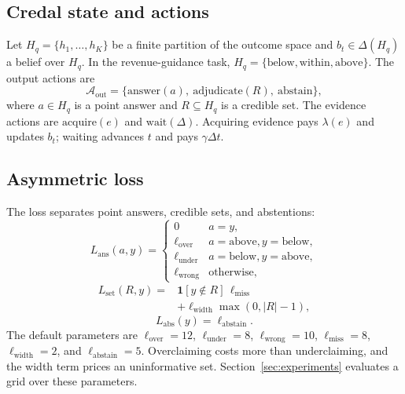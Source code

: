 \documentclass[11pt]{article}
\newcommand{\indic}{\mathbf{1}}
\begin{document}
\subsection{Credal state and actions}
Let $H_q=\{h_1,\dots,h_K\}$ be a finite partition of the outcome space and $b_t\in\Delta(H_q)$ a belief over $H_q$. In the revenue-guidance task, $H_q=\{\text{below},\text{within},\text{above}\}$. The output actions are
\begin{equation}
\mathcal A_{\text{out}}=\{\text{answer}(a),\ \text{adjudicate}(R),\ \text{abstain}\},
\end{equation}
where $a\in H_q$ is a point answer and $R\subseteq H_q$ is a credible set. The evidence actions are $\text{acquire}(e)$ and $\text{wait}(\Delta)$. Acquiring evidence pays $\lambda(e)$ and updates $b_t$; waiting advances $t$ and pays $\gamma\Delta t$.

\subsection{Asymmetric loss}
The loss separates point answers, credible sets, and abstentions:
\begin{equation}
L_{\text{ans}}(a,y)=
\begin{cases}
0 & a=y,\\
\ell_{\text{over}} & a=\text{above}, y=\text{below},\\
\ell_{\text{under}} & a=\text{below}, y=\text{above},\\
\ell_{\text{wrong}} & \text{otherwise},
\end{cases}
\label{eq:answer-loss}
\end{equation}
\begin{equation}
\begin{split}
L_{\text{set}}(R,y)=&\indic[y\notin R]\,\ell_{\text{miss}}\\
&+\ell_{\text{width}}\max(0,|R|-1),
\end{split}
\label{eq:set-loss}
\end{equation}
\begin{equation}
L_{\text{abs}}(y)=\ell_{\text{abstain}}.
\label{eq:abstain-loss}
\end{equation}
The default parameters are $\ell_{\text{over}}=12$, $\ell_{\text{under}}=8$, $\ell_{\text{wrong}}=10$, $\ell_{\text{miss}}=8$, $\ell_{\text{width}}=2$, and $\ell_{\text{abstain}}=5$. Overclaiming costs more than underclaiming, and the width term prices an uninformative set. Section~\ref{sec:experiments} evaluates a grid over these parameters.
\end{document}
